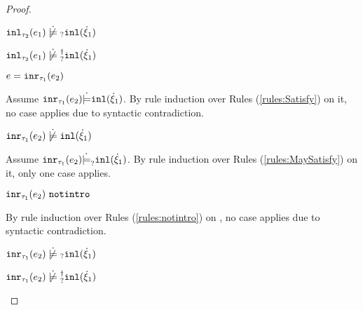 \begin{proof}
\begin{byCases}
\begin{byCases}
\begin{byCases}
\begin{byCases}
            \end{byCases}
            \begin{pfsteps*}
            \item $\cnotmaysatisfy{\hinl{\tau_2}{e_1}}{\cinl{\hxi_1}}$  
            \item $\cnotsatisfyormay{\hinl{\tau_2}{e_1}}{\cinl{\hxi_1}}$ 
            \end{pfsteps*}
        \end{byCases}
    \item[\text{(\ref{rule:TInr})}]
        \begin{pfsteps*}
        \item $e=\mathtt{inr}_{\tau_1}({e_2})$ 
        \end{pfsteps*}
        Assume $\mathtt{inr}_{\tau_1}({e_2}) \dot{\models} \mathtt{inl}(\dot{\xi}_1)$. By rule induction over Rules (\ref{rules:Satisfy}) on it, no case applies due to syntactic contradiction.
        \begin{pfsteps*}
        \item $\cnotsatisfy{\hinr{\tau_1}{e_2}}{\cinl{\hxi_1}}$  
        \end{pfsteps*}
        Assume $\mathtt{inr}_{\tau_1}({e_2}) \dot{\models}_{?} \mathtt{inl}(\dot{\xi}_1)$. By rule induction over Rules (\ref{rules:MaySatisfy}) on it, only one case applies.
        \begin{byCases}
        \item[\text{(\ref{rule:CMSNotIntro})}]
            \begin{pfsteps*}
            \item $\mathtt{inr}_{\tau_1}({e_2}) ~\mathtt{notintro}$  
            \end{pfsteps*}
            By rule induction over Rules (\ref{rules:notintro}) on , no case applies due to syntactic contradiction.
        \end{byCases}
        \begin{pfsteps*}
        \item $\cnotmaysatisfy{\hinr{\tau_1}{e_2}}{\cinl{\hxi_1}}$  
        \item $\cnotsatisfyormay{\hinr{\tau_1}{e_2}}{\cinl{\hxi_1}}$ 
        \end{pfsteps*}

\end{byCases}
\end{byCases}
\end{proof}
